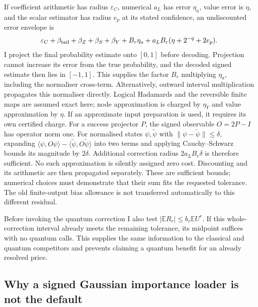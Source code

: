 If coefficient arithmetic has radius $\varepsilon_C$, numerical $a_L$
has error $\eta_a$, value error is $\eta$, and the scalar estimator has
radius $e_p$ at its stated confidence, an undiscounted error envelope is
\begin{equation}
 \varepsilon_C+\beta_{\rm tail}+\beta_Z+\beta_S+\beta_Y
       +B_r\eta_a+a_LB_r(\eta+2^{-q}+2e_p).
 \label{eq:quantum-remainder-full-interface}
\end{equation}
I project the final probability estimate onto $[0,1]$ before decoding.
Projection cannot increase its error from the true probability, and the
decoded signed estimate then lies in $[-1,1]$. This supplies the factor
$B_r$ multiplying $\eta_a$, including the normaliser cross-term. Alternatively, outward interval multiplication propagates
this normaliser directly. Logical Hadamards and the reversible finite maps are assumed exact here;
node approximation is charged by $\eta_Y$ and value approximation by $\eta$.
If an approximate input preparation is used, it requires its own certified
charge. For a success projector $P$, the signed observable $O=2P-I$ has
operator norm one. For normalised states $\psi,\widetilde\psi$ with
$\|\psi-\widetilde\psi\|\leq\delta$, expanding
$\langle\psi,O\psi\rangle-\langle\widetilde\psi,O\widetilde\psi\rangle$
into two terms and applying Cauchy--Schwarz bounds its magnitude by
$2\delta$. Additional correction radius $2a_LB_r\delta$ is therefore
sufficient. No such approximation is
silently assigned zero cost. Discounting and its arithmetic are then
propagated separately. These are sufficient bounds; numerical choices
must demonstrate that their sum fits the requested tolerance. The old
finite-output bias allowance is not transferred automatically to this
different residual.

Before invoking the quantum correction I also test
$|\mathbb E R_r|\leq b_r\mathbb E U^r$. If this whole-correction interval
already meets the remaining tolerance, its midpoint suffices with no
quantum calls. This supplies the same information to the classical and
quantum competitors and prevents claiming a quantum benefit for an
already resolved price.

\subsection{Why a signed Gaussian importance loader is not the default}

